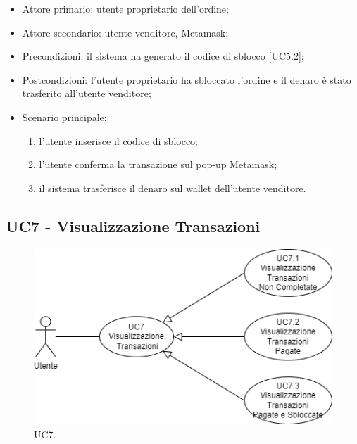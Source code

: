 \begin{itemize}
    \item Attore primario: utente proprietario dell'ordine;
    \item Attore secondario: utente venditore, Metamask;
    \item Precondizioni: il sistema ha generato il codice di sblocco [UC5.2];
    \item Postcondizioni: l'utente proprietario ha sbloccato l'ordine e il denaro è stato trasferito all'utente venditore;
    \item Scenario principale:
    \begin{enumerate}
        \item l'utente inserisce il codice di sblocco;
        \item l'utente conferma la transazione sul pop-up Metamask;
        \item il sistema trasferisce il denaro sul wallet dell'utente venditore.
    \end{enumerate}
\end{itemize}

\subsection{UC7 - Visualizzazione Transazioni}

\begin{figure}[H]
    \centering
    \includegraphics[scale=0.7]{immagini/UseCases-UC7.png}
    \caption{UC7.}
  \end{figure}

